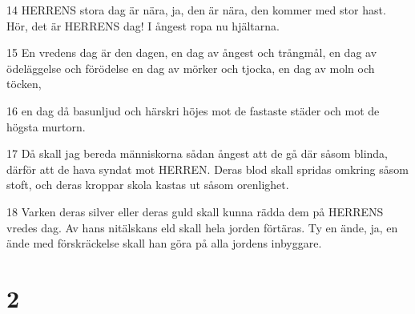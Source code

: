 \par 14 HERRENS stora dag är nära, ja, den är nära, den kommer med stor hast. Hör, det är HERRENS dag! I ångest ropa nu hjältarna.
\par 15 En vredens dag är den dagen, en dag av ångest och trångmål, en dag av ödeläggelse och förödelse en dag av mörker och tjocka, en dag av moln och töcken,
\par 16 en dag då basunljud och härskri höjes mot de fastaste städer och mot de högsta murtorn.
\par 17 Då skall jag bereda människorna sådan ångest att de gå där såsom blinda, därför att de hava syndat mot HERREN. Deras blod skall spridas omkring såsom stoft, och deras kroppar skola kastas ut såsom orenlighet.
\par 18 Varken deras silver eller deras guld skall kunna rädda dem på HERRENS vredes dag. Av hans nitälskans eld skall hela jorden förtäras. Ty en ände, ja, en ände med förskräckelse skall han göra på alla jordens inbyggare.

\chapter{2}

